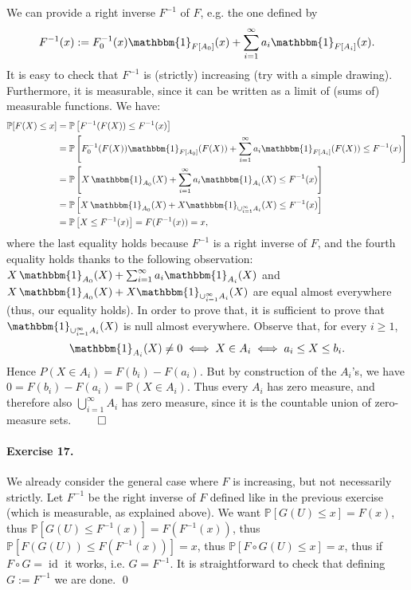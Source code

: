 \documentclass[12pt,a4paper]{report}
\theoremstyle{definition}
\theoremstyle{num.custom-title}
\DeclareMathOperator{\id}{id}
\renewcommand{\P}{\mathbb{P}}
\renewcommand{\1}{\mathbbm{1}}
\begin{document}
We can provide a right inverse $F^{-1}$ of $F$, e.g. the one defined by
\[
F^{-1}(x):=F_0^{-1}(x) \1_{F[A_0]}(x) + \sum_{i=1}^\infty a_i \1_{F[A_i]}(x).
\]
It is easy to check that $F^{-1}$ is (strictly) increasing (try with a simple drawing). Furthermore, it is measurable, since it can be written as a limit of (sums of) measurable functions. We have:
\begin{align*}
\P[F(X) \leq x] 
&= \P \left[ F^{-1}(F(X)) \leq F^{-1}(x) \right]\\
&= \P \left[ F_0^{-1}(F(X)) \1_{F[A_0]}(F(X)) + \sum_{i=1}^\infty a_i \1_{F[A_i]}(F(X)) \leq F^{-1}(x) \right]\\
&= \P \left[ X \, \1_{A_0}(X) + \sum_{i=1}^\infty a_i \1_{A_i}(X) \leq F^{-1}(x) \right]\\
&= \P \left[ X \, \1_{A_0}(X) + X \1_{\cup_{i=1}^\infty A_i}(X) \leq F^{-1}(x) \right]\\
&= \P \left[ X \leq F^{-1}(x) \right] = F(F^{-1}(x)) = x, \\
\end{align*}
where the last equality holds because $F^{-1}$ is a right inverse of $F$, and the fourth equality holds thanks to the following observation: $X \, \1_{A_0}(X) + \sum_{i=1}^\infty a_i \1_{A_i}(X)$ and $X \, \1_{A_0}(X) + X \1_{\cup_{i=1}^\infty A_i}(X)$ are equal almost everywhere (thus, our equality holds). In order to prove that, it is sufficient to prove that $\1_{\cup_{i=1}^\infty A_i}(X)$ is null almost everywhere. Observe that, for every $i \geq 1$,
\[
\1_{A_i}(X) \neq 0 \iff X \in A_i \iff a_i \leq X \leq b_i.
\]
Hence $P(X \in A_i) = F(b_i)-F(a_i)$. But by construction of the $A_i$'s, we have $0=F(b_i)-F(a_i)=\P(X \in A_i)$. Thus every $A_i$ has zero measure, and therefore also $\bigcup_{i=1}^\infty A_i$ has zero measure, since it is the countable union of zero-measure sets. $\qed$

\paragraph{Exercise 17.} We already consider the general case where $F$ is increasing, but not necessarily strictly. Let $F^{-1}$ be the right inverse of $F$ defined like in the previous exercise (which is measurable, as explained above). We want $\P[G(U) \leq x] = F(x)$, thus $\P[G(U) \leq F^{-1}(x)] = F(F^{-1}(x))$, thus $\P[F(G(U)) \leq F(F^{-1}(x))] = x$, thus $\P[F \circ G (U) \leq x] = x$, thus if $F \circ G = \id$ it works, i.e. $G=F^{-1}$. It is straightforward to check that defining $G:=F^{-1}$ we are done. \qed
\end{document}
